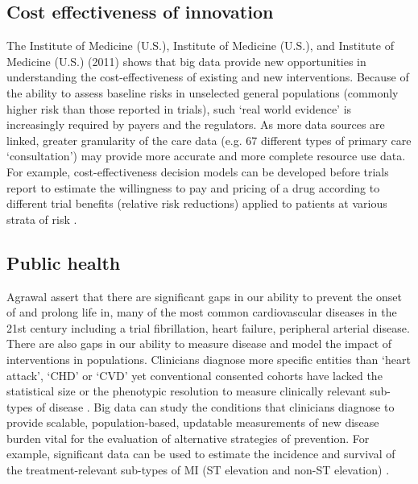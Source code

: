 \documentclass[sigconf]{acmart}
\begin{document}
\subsection{Cost effectiveness of innovation}
The Institute of Medicine (U.S.), Institute of Medicine (U.S.), and Institute of Medicine (U.S.) (2011) shows that big data provide new opportunities in understanding the cost-effectiveness of existing and new interventions. Because of the ability to assess baseline risks in unselected general populations (commonly higher risk than those reported in trials), such ‘real world evidence' is increasingly required by payers and the regulators. As more data sources are linked, greater granularity of the care data (e.g. 67 different types of primary care ‘consultation') may provide more accurate and more complete resource use data. For example, cost-effectiveness decision models can be developed before trials report to estimate the willingness to pay and pricing of a drug according to different trial benefits (relative risk reductions) applied to patients at various strata of risk \cite{muenke2015congenital}.

\subsection{Public health}
Agrawal \cite{agrawal1993mining} assert that there are significant gaps in our ability to prevent the onset of and prolong life in, many of the most common cardiovascular diseases in the 21st century including a trial fibrillation, heart failure, peripheral arterial disease. There are also gaps in our ability to measure disease and model the impact of interventions in populations. Clinicians diagnose more specific entities than ‘heart attack', ‘CHD' or ‘CVD' yet conventional consented cohorts have lacked the statistical size or the phenotypic resolution to measure clinically relevant sub-types of disease \cite{chu2009bayesian}. Big data can study the conditions that clinicians diagnose to provide scalable, population-based, updatable measurements of new disease burden vital for the evaluation of alternative strategies of prevention. For example, significant data can be used to estimate the incidence and survival of the treatment-relevant sub-types of MI (ST elevation and non-ST elevation) \cite{dietterich2000ensemble}.
\end{document}
